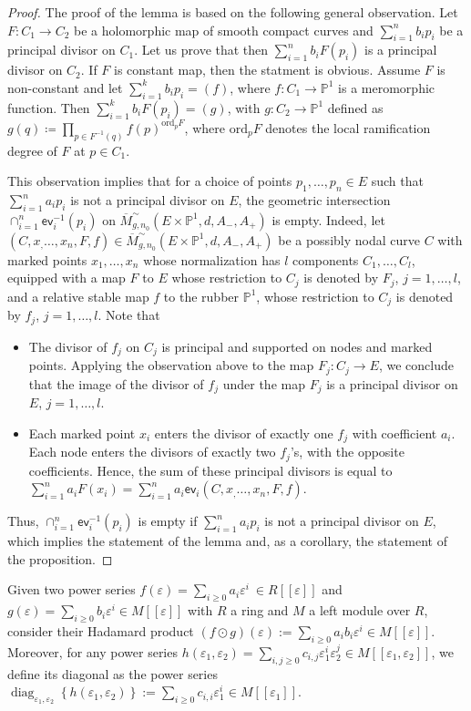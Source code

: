 \documentclass{amsart}
\numberwithin{equation}{section} %
\theoremstyle{plain}
\theoremstyle{remark}
\begin{document}
\begin{proof}
The proof of the lemma is based on the following general observation. Let $F\colon C_1\to C_2$ be a holomorphic map of smooth compact curves and $\sum_{i=1}^n b_i p_i$ be a principal divisor on $C_1$. Let us prove that then $\sum_{i=1}^n b_i F(p_i)$ is a principal divisor on $C_2$. If $F$ is constant map, then the statment is obvious. Assume $F$ is non-constant and let $\sum_{i=1}^k b_i p_i = (f)$, where $f\colon C_1\to \mathbb{P}^1$ is a meromorphic function. Then $\sum_{i=1}^k b_i F(p_i) = (g)$, with $g\colon C_2\to \mathbb{P}^1$ defined as $g(q) \coloneqq \prod_{p\in F^{-1}(q)} f(p)^{\mathrm{ord}_p F}$, where $\mathrm{ord}_p F$ denotes the local ramification degree of $F$ at $p\in C_1$. 
	
This observation implies that for a choice of points $p_1,\dots,p_n\in E$ such that $\sum_{i=1}^n a_i p_i$ is not a principal divisor on $E$, the geometric intersection $\cap_{i=1}^n \mathsf{ev}_i^{-1}(p_i)$ on $\overline{M}^\sim_{g,n_0}(E
\times \mathbb{P}^1, d, A_-, A_+)$ is empty. Indeed, let $(C,x_,\dots,x_n,F,f)\in \overline{M}^\sim_{g,n_0}(E
\times \mathbb{P}^1, d, A_-, A_+)$ be a possibly nodal curve $C$ with marked points $x_1,\dots,x_n$ whose normalization has $l$ components $C_1,\dots,C_l$, equipped with a map $F$ to $E$ whose restriction to $C_j$ is denoted by $F_j$, $j=1,\dots,l$, and a relative stable map $f$ to the rubber $\mathbb{P}^1$, whose restriction to $C_j$ is denoted by $f_j$, $j=1,\dots,l$. Note that
\begin{itemize}
	\item The divisor of $f_j$ on $C_j$ is principal and supported on nodes and marked points. Applying the observation above to the map $F_j\colon C_j\to E$, we conclude that the image of the divisor of $f_j$ under the map $F_j$ is a principal divisor on $E$, $j=1,\dots,l$. 
	\item Each marked point $x_i$ enters the divisor of exactly one $f_j$ with coefficient $a_i$. Each node enters the divisors of exactly two $f_j$'s, with the opposite coefficients. Hence, the sum of these principal divisors is equal to $\sum_{i=1}^n a_i F(x_i) = \sum_{i=1}^n a_i \mathsf{ev}_i(C,x_,\dots,x_n,F,f)$.
\end{itemize}
Thus,  $\cap_{i=1}^n \mathsf{ev}_i^{-1}(p_i)$ is empty if  $\sum_{i=1}^n a_i p_i$ is not a principal divisor on $E$, which implies the statement of the lemma and, as a corollary, the statement of the proposition.
\end{proof}

Given two power series $f(\varepsilon)= \sum_{i\geq 0} a_i \varepsilon^i\ \in R[[\varepsilon]]$ and $g(\varepsilon)= \sum_{i\geq 0} b_i \varepsilon^i \in M[[\varepsilon]]$ with $R$ a ring and $M$ a left module over $R$, consider their Hadamard product $(f \odot g)(\varepsilon) := \sum_{i \geq 0} a_i b_i \varepsilon^i \in M[[\varepsilon]]$. Moreover, for any power series $h(\varepsilon_1,\varepsilon_2) = \sum_{i,j \geq 0} c_{i,j} \varepsilon_1^i \varepsilon_2^j \in M[[\varepsilon_1,\varepsilon_2]]$, we define its diagonal as the power series $\operatorname{diag}_{\varepsilon_1,\varepsilon_2}\left\{ h(\varepsilon_1,\varepsilon_2)\right\} := \sum_{i\geq 0} c_{i,i} \varepsilon_1^i \in M[[\varepsilon_1]]$.\\
\end{document}
